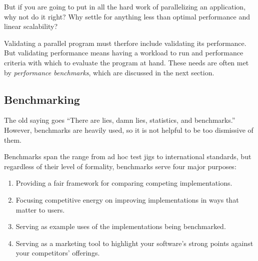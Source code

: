 \QuickQuiz{}
	But if you are going to put in all the hard work of parallelizing
	an application, why not do it right?
	Why settle for anything less than optimal performance and
	linear scalability?
 \QuickQuizEnd

Validating a parallel program must therfore include validating its
performance.
But validating performance means having a workload to run and performance
criteria with which to evaluate the program at hand.
These needs are often met by \emph{performance benchmarks}, which
are discussed in the next section.

\subsection{Benchmarking}
\label{sec:debugging:Benchmarking}

The old saying goes ``There are lies, damn lies, statistics,
and benchmarks.''
However, benchmarks are heavily used, so it is not helpful to
be too dismissive of them.

Benchmarks span the range from ad hoc test jigs to international
standards, but regardless of their level of formality, benchmarks
serve four major purposes:

\begin{enumerate}
\item	Providing a fair framework for comparing competing implementations.
\item	Focusing competitive energy on improving implementations in ways
	that matter to users.
\item	Serving as example uses of the implementations being benchmarked.
\item	Serving as a marketing tool to highlight your software's
	strong points against your competitors' offerings.
\end{enumerate}


